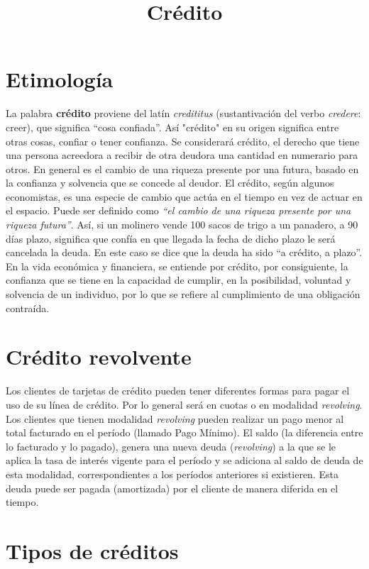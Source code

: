 \documentclass{article}
\title{Crédito}
\begin{document}
\maketitle

\section{Etimología}
La palabra \textbf{crédito} proviene del latín \emph{credititus} (sustantivación del verbo \emph{credere}: creer), que significa ``cosa confiada''. Así "crédito" en su origen significa entre otras cosas, confiar o tener confianza. Se considerará crédito, el derecho que tiene una persona acreedora a recibir de otra deudora una cantidad en numerario para otros. En general es el cambio de una riqueza presente por una futura, basado en la confianza y solvencia que se concede al deudor. El crédito, según algunos economistas, es una especie de cambio que actúa en el tiempo en vez de actuar en el espacio. Puede ser definido como \textit{``el cambio de una riqueza presente por una riqueza futura''}. Así, si un molinero vende 100 sacos de trigo a un panadero, a 90 días plazo, significa que confía en que llegada la fecha de dicho plazo le será cancelada la deuda. En este caso se dice que la deuda ha sido ``a crédito, a plazo''. En la vida económica y financiera, se entiende por crédito, por consiguiente, la confianza que se tiene en la capacidad de cumplir, en la posibilidad, voluntad y solvencia de un individuo, por lo que se refiere al cumplimiento de una obligación contraída.

\section{Crédito revolvente}

Los clientes de tarjetas de crédito pueden tener diferentes formas para pagar el uso de su línea de crédito. Por lo general será en cuotas o en modalidad \emph{revolving}. Los clientes que tienen modalidad \emph{revolving} pueden realizar un pago menor al total facturado en el período (llamado Pago Mínimo). El saldo (la diferencia entre lo facturado y lo pagado), genera una nueva deuda (\emph{revolving}) a la que se le aplica la tasa de interés vigente para el período y se adiciona al saldo de deuda de esta modalidad, correspondientes a los períodos anteriores si existieren. Esta deuda puede ser pagada (amortizada) por el cliente de manera diferida en el tiempo.

\section{Tipos de créditos}
\end{document}
